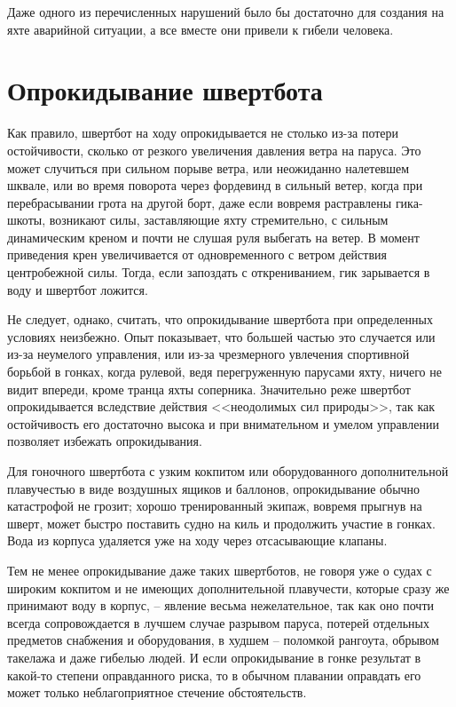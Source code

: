 \documentclass[a4paper, 12pt, twoside, final]{scrbook}
\begin{document}
Даже одного из перечисленных нарушений было бы достаточно для создания на яхте аварийной ситуации, а все вместе они привели к гибели человека.

\section{Опрокидывание швертбота}

Как правило, швертбот на ходу опрокидывается не столько из-за потери остойчивости, сколько от резкого увеличения давления ветра на паруса. Это может случиться при сильном порыве ветра, или неожиданно налетевшем шквале, или во время поворота через фордевинд в сильный ветер, когда при перебрасывании грота на другой борт, даже если вовремя растравлены гика-шкоты, возникают силы, заставляющие яхту стремительно, с сильным динамическим креном и почти не слушая руля выбегать на ветер. В момент приведения крен увеличивается от одновременного с ветром действия центробежной силы. Тогда, если запоздать с открениванием, гик зарывается в воду и швертбот ложится.

Не следует, однако, считать, что опрокидывание швертбота при определенных условиях неизбежно. Опыт показывает, что большей частью это случается или из-за неумелого управления, или из-за чрезмерного увлечения спортивной борьбой в гонках, когда рулевой, ведя перегруженную парусами яхту, ничего не видит впереди, кроме транца яхты соперника. Значительно реже швертбот опрокидывается вследствие действия <<неодолимых сил природы>>, так как остойчивость его достаточно высока и при внимательном и умелом управлении позволяет избежать опрокидывания.

Для гоночного швертбота с узким кокпитом или оборудованного дополнительной плавучестью в виде воздушных ящиков и баллонов, опрокидывание обычно катастрофой не грозит; хорошо тренированный экипаж, вовремя прыгнув на шверт, может быстро поставить судно на киль и продолжить участие в гонках. Вода из корпуса удаляется уже на ходу через отсасывающие клапаны.

Тем не менее опрокидывание даже таких швертботов, не говоря уже о судах с широким кокпитом и не имеющих дополнительной плавучести, которые сразу же принимают воду в корпус, \--- явление весьма нежелательное, так как оно почти всегда сопровождается в лучшем случае разрывом паруса, потерей отдельных предметов снабжения и оборудования, в худшем \--- поломкой рангоута, обрывом такелажа и даже гибелью людей. И если опрокидывание в гонке результат в какой-то степени оправданного риска, то в обычном плавании оправдать его может только неблагоприятное стечение обстоятельств.
\end{document}

